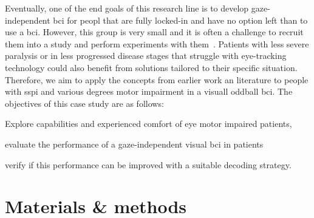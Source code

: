 Eventually, one of the end goals of this research line is to develop
gaze-independent \ac{bci} for peopl that are fully locked-in and have no option left than to use a \ac{bci}.
However, this group is very small and it is often a challenge to recruit them
into a study and perform experiments with them~\cite{Wolpaw2006}.
Patients with less severe paralysis or in less progressed disease stages that struggle with
eye-tracking technology could also benefit from
solutions tailored to their specific situation.
Therefore, we aim to apply the concepts from earlier work an literature to
people with \ac{sspi} and various degrees motor impairment in a visuall oddball
\ac{bci}.
The objectives of this case study are as follows:
\begin{enumerate*}
  \item Explore capabilities and experienced comfort of eye motor impaired
    patients,
  \item evaluate the performance of a gaze-independent visual \ac{bci} in patients
  \item verify if this performance can be improved with a suitable decoding
    strategy.
\end{enumerate*}


\section{Materials \& methods}
